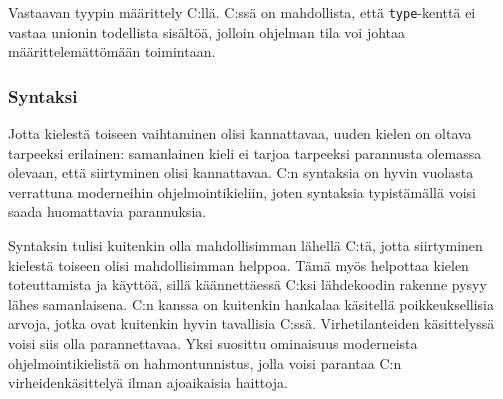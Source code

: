\FloatBarrier

\begin{listing}[ht!]
    \inputminted{C}{sumtype.c}
    \caption{Vastaavan tyypin määrittely C:llä. C:ssä on mahdollista, että
    \texttt{type}-kenttä ei vastaa unionin todellista sisältöä, jolloin
    ohjelman tila voi johtaa määrittelemättömään toimintaan.}
    \label{fig:sumtypec}
\end{listing}

\FloatBarrier


\subsubsection{Syntaksi}

Jotta kielestä toiseen vaihtaminen olisi kannattavaa, uuden kielen on oltava
tarpeeksi erilainen: samanlainen kieli ei tarjoa tarpeeksi parannusta
olemassa olevaan, että siirtyminen olisi kannattavaa. C:n syntaksia on hyvin
vuolasta verrattuna moderneihin ohjelmointikieliin, joten syntaksia
typistämällä voisi saada huomattavia parannuksia.

%

Syntaksin tulisi kuitenkin olla mahdollisimman lähellä C:tä, jotta siirtyminen
kielestä toiseen olisi mahdollisimman helppoa. Tämä myös helpottaa kielen
toteuttamista ja käyttöä, sillä käännettäessä C:ksi lähdekoodin rakenne pysyy
lähes samanlaisena. C:n kanssa on kuitenkin hankalaa käsitellä poikkeuksellisia
arvoja, jotka ovat kuitenkin hyvin tavallisia C:ssä. Virhetilanteiden
käsittelyssä voisi siis olla parannettavaa. Yksi suosittu ominaisuus
moderneista ohjelmointikielistä on hahmontunnistus,
jolla voisi parantaa C:n virheidenkäsittelyä ilman ajoaikaisia haittoja.

